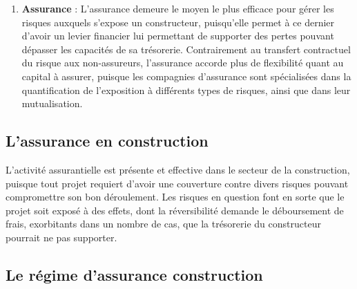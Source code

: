\documentclass[11pt]{article}
\begin{document}
\begin{enumerate}
\item \textbf{Assurance} : L'assurance demeure le moyen le plus efficace pour gérer les risques auxquels s'expose un constructeur, puisqu'elle permet à ce dernier d'avoir un levier financier lui permettant de supporter des pertes pouvant dépasser les capacités de sa trésorerie. Contrairement au transfert contractuel du risque aux non-assureurs, l'assurance accorde plus de flexibilité quant au capital à assurer, puisque les compagnies d'assurance sont spécialisées dans la quantification de l'exposition à différents types de risques, ainsi que dans leur mutualisation.  
\end{enumerate}

\subsection{L'assurance en construction}

L'activité assurantielle est présente et effective dans le secteur de la construction, puisque tout projet requiert d'avoir une couverture contre divers risques pouvant compromettre son bon déroulement. Les risques en question font en sorte que le projet soit exposé à des effets, dont la réversibilité demande le déboursement de frais, exorbitants dans un nombre de cas, que la trésorerie du constructeur pourrait ne pas supporter.

\subsection{Le régime d'assurance construction}
\end{document}

